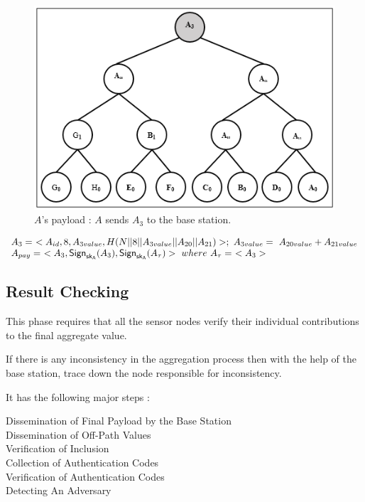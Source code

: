 \documentclass[%
  slidesonly,%
  semlayer%
  ]{seminar}                                  %
\newcommand{\sk}{\sf{sk}}
\begin{document}
\begin{slide}
      \begin{figure}[h!]
        \centering
        \includegraphics[scale = 0.5]{images/a-payload.png}
        \caption{$A$'s payload : $A$ sends $A_{3}$ to the base station.}
        \label{fig:a-payload}
      \end{figure}

      \begin{equation*}
        \begin{array}{l}
        A_{3} =\ <A_{id}, 8, A_{3value}, H(N||8||A_{3value}||A_{20}||A_{21})>;\ A_{3value} =\ A_{20value} + A_{21value}\\
        A_{pay} =\ <A_{3},\textsf{Sign}_{\sk_{A}}(A_{3}),\textsf{Sign}_{\sk_{A}}(A_{\tau})>\ where\ A_{\tau} =\ <A_{3}>
        \end{array}
      \end{equation*}
     \vfill
     \clearpage

    \subsection*{Result Checking}
      This phase requires that all the sensor nodes verify their individual contributions to the final aggregate value.

      If there is any inconsistency in the aggregation process then with the help of the base station, trace down the node responsible for inconsistency.

      It has the following major steps :
      \begin{description}
        \item [Dissemination of Final Payload by the Base Station]
        \item [Dissemination of Off-Path Values]
        \item [Verification of Inclusion]
        \item [Collection of Authentication Codes]
        \item [Verification of Authentication Codes]
        \item [Detecting An Adversary]
      \end{description}


\end{slide}
\end{document}
